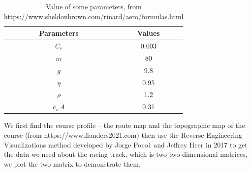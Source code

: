 \documentclass[12pt]{article}
\begin{document}
\begin{table}[H]
    \centering
    \begin{tabular}{cc}
        \toprule
        \bf Parameters & \bf Values \\
        \midrule
        $C_r$          & 0.003      \\
        $m$            & 80         \\
        $g$            & 9.8        \\
        $\eta $        & 0.95       \\
        $\rho  $       & 1.2        \\
        $c_wA$         & 0.31       \\
        \bottomrule
    \end{tabular}
    \caption{Value of some parameters, from https://www.sheldonbrown.com/rinard/aero/formulas.html}
\end{table}
We first find the course profile -- the route map and the topographic map of the course (from https://www.flanders2021.com)
then use the Reverse-Engineering Visualizations method developed by Jorge Poco1 and Jeffrey Heer in 2017\cite{poco2017reverse} to get the data we need about the racing track,
which is two two-dimensional matrices, we plot the two matrix to demonstrate them.
\end{document}
